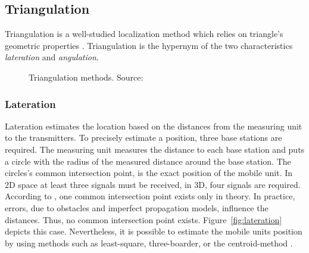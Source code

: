 \subsection{Triangulation}\label{sec:fund_trilateration}
Triangulation is a well-studied localization method which relies on triangle's geometric properties \citep{IEEE:survey_wireless_indoor_pos, wang:bt_pos}. Triangulation is the hypernym of the two characteristics \emph{lateration} and \emph{angulation}.

\begin{figure}[width=0.9\textwidth, height=0.4\textheight]
\caption {Triangulation methods. Source:~\citep{wang:bt_pos}}
\label{fig:triangulation}
\end{figure}

\subsubsection*{Lateration}
Lateration estimates the location based on the distances from the measuring unit to the transmitters. To precisely estimate a position, three base stations are required. The measuring unit measures the distance to each base station and puts a circle with the radius of the measured distance around the base station. The circles's common intersection point, is the exact position of the mobile unit. In 2D space at least three signals must be received, in 3D, four signals are required. According to \citet{wang:bt_pos}, one common intersection point exists only in theory. In practice, errors, due to obstacles and imperfect propagation models, influence the distances. Thus, no common intersection point exists. Figure~\ref{fig:lateration} depicts this case. Nevertheless, it is possible to estimate the mobile units position by using methods such as least-square, three-boarder, or the centroid-method \citep{wang:bt_pos, IEEE:survey_wireless_indoor_pos}.  

